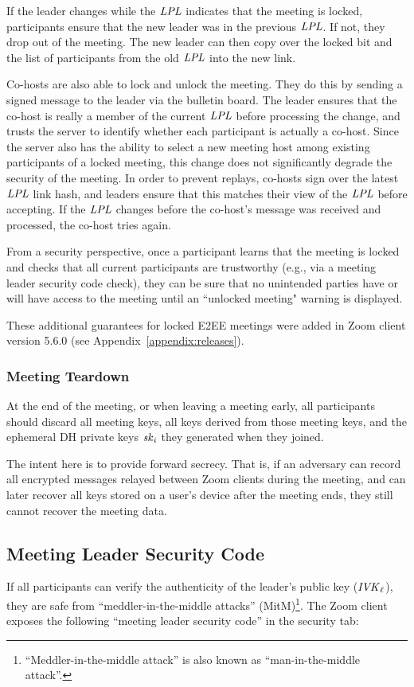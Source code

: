 If the leader changes while the $\mathit{LPL}$ indicates that the meeting is locked, participants ensure that the new leader was in the previous $\mathit{LPL}$. If not, they drop out of the meeting. The new leader can then copy over the locked bit and the list of participants from the old $\mathit{LPL}$ into the new link.

Co-hosts are also able to lock and unlock the meeting. They do this by sending a signed message to the leader via the bulletin board. The leader ensures that the co-host is really a member of the current $\mathit{LPL}$ before processing the change, and trusts the server to identify whether each participant is actually a co-host. Since the server also has the ability to select a new meeting host among existing participants of a locked meeting, this change does not significantly degrade the security of the meeting. In order to prevent replays, co-hosts sign over the latest $\mathit{LPL}$ link hash, and leaders ensure that this matches their view of the $\mathit{LPL}$ before accepting. If the $\mathit{LPL}$ changes before the co-host's message was received and processed, the co-host tries again.

From a security perspective, once a participant learns that the meeting is locked and checks that all current participants are trustworthy (e.g., via a meeting leader security code check), they can be sure that no unintended parties have or will have access to the meeting until an ``unlocked meeting" warning is displayed. 

These additional guarantees for locked E2EE meetings were added in Zoom client version 5.6.0 (see Appendix~\ref{appendix:releases}).

\subsubsection{Meeting Teardown}
At the end of the meeting, or when leaving a meeting early, all participants should discard all meeting keys, all keys derived from those meeting keys, and the ephemeral DH private keys $\mathit{sk}_i$ they generated when they joined.

The intent here is to provide forward secrecy. That is, if an adversary can record all encrypted messages relayed between Zoom clients during the meeting, and can later recover all keys stored on a user's device after the meeting ends, they still cannot recover the meeting data.

\subsection{Meeting Leader Security Code}\label{subsec:securitycode}
If all participants can verify the authenticity of the leader's public key ($\mathit{IVK}_{\ell}$), they are safe from ``meddler-in-the-middle attacks'' (MitM)\footnote{``Meddler-in-the-middle attack'' is also known as ``man-in-the-middle attack''.}. The Zoom client exposes the following ``meeting leader security code'' in the security tab:

